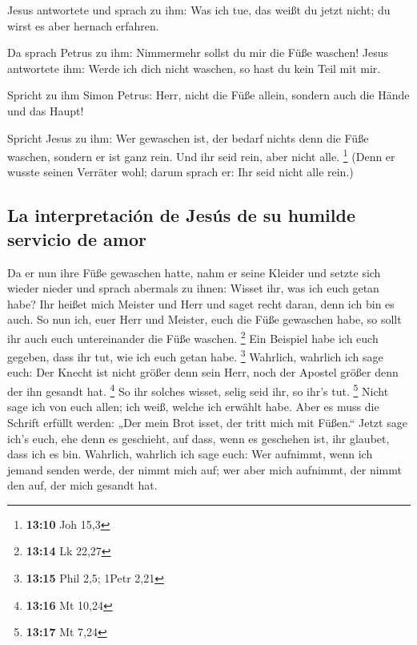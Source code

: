  Jesus antwortete und sprach zu ihm: Was ich tue, das
weißt du jetzt nicht; du wirst es aber hernach erfahren.

 Da sprach Petrus zu ihm: Nimmermehr sollst du mir die
Füße waschen! Jesus antwortete ihm: Werde ich dich nicht waschen, so
hast du kein Teil mit mir.

 Spricht zu ihm Simon Petrus: Herr, nicht die Füße allein,
sondern auch die Hände und das Haupt!

 Spricht Jesus zu ihm: Wer gewaschen ist, der bedarf
nichts denn die Füße waschen, sondern er ist ganz rein. Und ihr seid
rein, aber nicht alle. \footnote{\textbf{13:10} Joh 15,3}
 (Denn er wusste seinen Verräter wohl; darum sprach er:
Ihr seid nicht alle rein.)

\hypertarget{la-interpretaciuxf3n-de-jesuxfas-de-su-humilde-servicio-de-amor}{%
\subsection{La interpretación de Jesús de su humilde servicio de
amor}\label{la-interpretaciuxf3n-de-jesuxfas-de-su-humilde-servicio-de-amor}}

 Da er nun ihre Füße gewaschen hatte, nahm er seine
Kleider und setzte sich wieder nieder und sprach abermals zu ihnen:
Wisset ihr, was ich euch getan habe?  Ihr heißet mich
Meister und Herr und saget recht daran, denn ich bin es auch.
 So nun ich, euer Herr und Meister, euch die Füße
gewaschen habe, so sollt ihr auch euch untereinander die Füße waschen.
\footnote{\textbf{13:14} Lk 22,27}  Ein Beispiel habe ich
euch gegeben, dass ihr tut, wie ich euch getan habe. \footnote{\textbf{13:15}
  Phil 2,5; 1Petr 2,21}  Wahrlich, wahrlich ich sage
euch: Der Knecht ist nicht größer denn sein Herr, noch der Apostel
größer denn der ihn gesandt hat. \footnote{\textbf{13:16} Mt 10,24}
 So ihr solches wisset, selig seid ihr, so ihr's tut.
\footnote{\textbf{13:17} Mt 7,24}  Nicht sage ich von
euch allen; ich weiß, welche ich erwählt habe. Aber es muss die Schrift
erfüllt werden: „Der mein Brot isset, der tritt mich mit Füßen.``
 Jetzt sage ich's euch, ehe denn es geschieht, auf dass,
wenn es geschehen ist, ihr glaubet, dass ich es bin. 
Wahrlich, wahrlich ich sage euch: Wer aufnimmt, wenn ich jemand senden
werde, der nimmt mich auf; wer aber mich aufnimmt, der nimmt den auf,
der mich gesandt hat.

